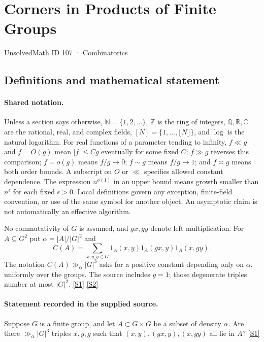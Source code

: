 \documentclass[11pt,a4paper]{article}
\newcommand{\N}{\mathbb{N}}
\newcommand{\Z}{\mathbb{Z}}
\newcommand{\Q}{\mathbb{Q}}
\newcommand{\R}{\mathbb{R}}
\newcommand{\C}{\mathbb{C}}
\newcommand{\sref}[2]{\hyperlink{source:#1:#2}{[S#2]}}
\begin{document}

\setcounter{section}{106}

\section{Corners in Products of Finite Groups}\label{107}

{\small\sffamily UnsolvedMath ID 107 · Combinatorics}

\subsection{Definitions and mathematical statement}

\paragraph{Shared notation.}Unless a section says otherwise, $\N=\{1,2,\ldots\}$,
$\Z$ is the ring of integers, $\Q,\R,\C$ are the rational, real, and complex
fields, $[N]=\{1,\ldots,\lfloor N\rfloor\}$, and $\log$ is the natural
logarithm. For real functions of a parameter tending to infinity,
$f\ll g$ and $f=O(g)$ mean $|f|\leq Cg$ eventually for some fixed $C$;
$f\gg g$ reverses this comparison; $f=o(g)$ means $f/g\to0$;
$f\sim g$ means $f/g\to1$; and $f\asymp g$ means both order bounds.
A subscript on $O$ or $\ll$ specifies allowed constant dependence.
The expression $n^{o(1)}$ in an upper bound means growth smaller than
$n^\epsilon$ for each fixed $\epsilon>0$. Local definitions govern any
exception, finite-field convention, or use of the same symbol for another
object. An asymptotic claim is not automatically an effective algorithm.



No commutativity of $G$ is assumed, and $gx,gy$ denote left multiplication. For $A\subseteq G^2$ put $\alpha=|A|/|G|^2$ and
\[C(A)=\sum_{x,y,g\in G}1_A(x,y)1_A(gx,y)1_A(x,gy).\]
The notation $C(A)\gg_\alpha |G|^3$ asks for a positive constant depending only on $\alpha$, uniformly over the groups. The source includes $g=1$; those degenerate triples number at most $|G|^2$. \sref{107}{1} \sref{107}{2}

\paragraph{Statement recorded in the supplied source.}
Suppose $G$ is a finite group, and let $A \subset G \times G$ be a subset of density $\alpha$. Are there $\gg_\alpha |G|^3$ triples $x, y, g$ such that $(x, y), (gx, y), (x, gy)$ all lie in $A$? \sref{107}{1}
\end{document}
